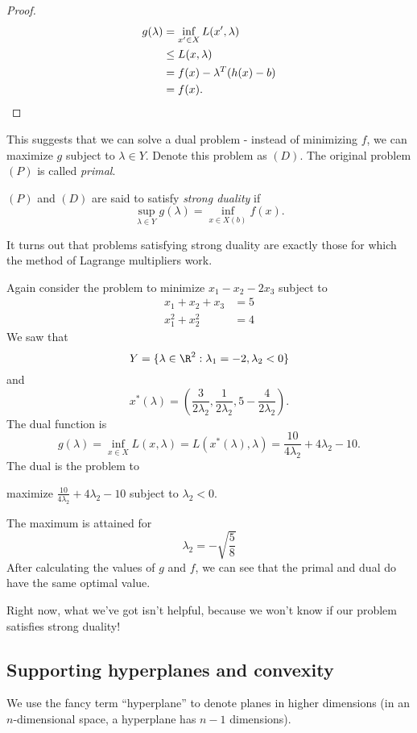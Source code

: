 \documentclass[a4paper]{article}
\begin{document}
\begin{proof}
  \begin{align*}
    g(\lambda) &= \inf_{x'\in X}L(x', \lambda)\\
    &\leq L(x, \lambda)\\
    &= f(x) - \lambda^T (h(x) - b)\\
    &= f(x).\qedhere
  \end{align*}
\end{proof}

This suggests that we can solve a dual problem - instead of minimizing $f$, we can maximize $g$ subject to $\lambda\in Y$. Denote this problem as $(D)$. The original problem $(P)$ is called \emph{primal}.

\begin{defi}
  $(P)$ and $(D)$ are said to satisfy \emph{strong duality} if
  \[
    \sup_{\lambda\in Y}g(\lambda) = \inf_{x\in X(b)}f(x).
  \]
\end{defi}
It turns out that problems satisfying strong duality are exactly those for which the method of Lagrange multipliers work.

\begin{eg}
  Again consider the problem to minimize $x_1 - x_2 - 2x_3$ subject to
  \begin{align*}
    x_1 + x_2 + x_3 &= 5\\
    x_1^2 + x_2^2 &= 4
  \end{align*}
  We saw that
  \[
    Y = \{\lambda\in \R^2: \lambda_1 = -2, \lambda_2 < 0\}
  \]
  and
  \[
    x^*(\lambda) = \left(\frac{3}{2\lambda_2}, \frac{1}{2\lambda_2}, 5 - \frac{4}{2\lambda_2}\right).
  \]
  The dual function is
  \[
    g(\lambda) = \inf_{x\in X} L(x, \lambda) = L(x^*(\lambda), \lambda) = \frac{10}{4\lambda_2} + 4\lambda_2 - 10.
  \]
  The dual is the problem to
  \begin{center}
    maximize $\frac{10}{4\lambda_2} + 4\lambda_2 - 10$ subject to $\lambda_2 < 0$.
  \end{center}
  The maximum is attained for
  \[
    \lambda_2 = -\sqrt{\frac{5}{8}}
  \]
  After calculating the values of $g$ and $f$, we can see that the primal and dual do have the same optimal value.
\end{eg}

Right now, what we've got isn't helpful, because we won't know if our problem satisfies strong duality!

\subsection{Supporting hyperplanes and convexity}
We use the fancy term ``hyperplane'' to denote planes in higher dimensions (in an $n$-dimensional space, a hyperplane has $n - 1$ dimensions).
\end{document}
